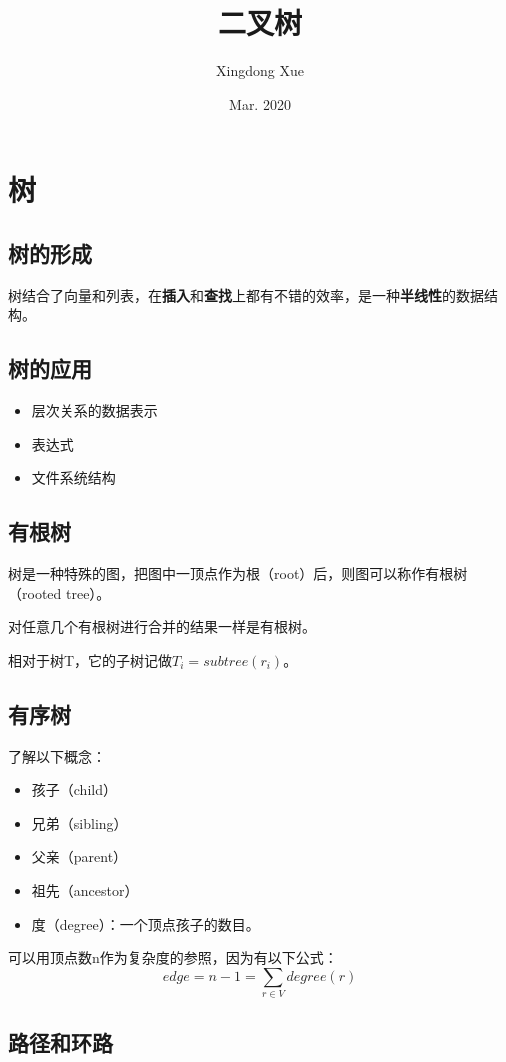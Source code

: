 \documentclass{article}
\title{二叉树}
\author{Xingdong Xue}
\date{Mar. 2020}
\begin{document}
\section{树}
\subsection{树的形成}
树结合了向量和列表，在\textbf{插入}和\textbf{查找}上都有不错的效率，是一种\textbf{半线性}的数据结构。

\subsection{树的应用}
\begin{itemize}
  \item 层次关系的数据表示
  \item 表达式
  \item 文件系统结构
\end{itemize}

\subsection{有根树}

树是一种特殊的图，把图中一顶点作为根（root）后，则图可以称作有根树（rooted tree）。

对任意几个有根树进行合并的结果一样是有根树。

相对于树T，它的子树记做$T_i = subtree(r_i)$。

\subsection{有序树}
了解以下概念：

\begin{itemize}
  \item 孩子（child）
  \item 兄弟（sibling）
  \item 父亲（parent）
  \item 祖先（ancestor）
  \item 度（degree）：一个顶点孩子的数目。
\end{itemize}

可以用顶点数n作为复杂度的参照，因为有以下公式：
$$edge = n-1 = \sum_{r \in V}{degree(r)} $$

\subsection{路径和环路}
\end{document}

